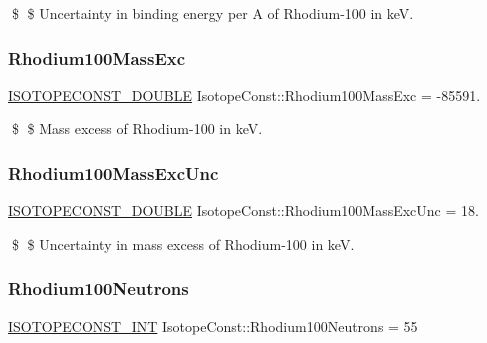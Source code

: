 \$ \$ Uncertainty in binding energy per A of Rhodium-\/100 in keV. \mbox{\label{group___isotope_const-_rhodium-_rh100_ga8375b85370324d155621dcaed4cbadf2}} 
\subsubsection{\texorpdfstring{Rhodium100\+Mass\+Exc}{Rhodium100MassExc}}
{\footnotesize\ttfamily \mbox{\hyperlink{group___isotope_const-_macros_ga8f45a7272ce02c0b4c65c44636ed719a}{I\+S\+O\+T\+O\+P\+E\+C\+O\+N\+S\+T\+\_\+\+D\+O\+U\+B\+LE}} Isotope\+Const\+::\+Rhodium100\+Mass\+Exc = -\/85591.}

\$ \$ Mass excess of Rhodium-\/100 in keV. \mbox{\label{group___isotope_const-_rhodium-_rh100_ga04c970123fe638c3a24f77a9545494cb}} 
\subsubsection{\texorpdfstring{Rhodium100\+Mass\+Exc\+Unc}{Rhodium100MassExcUnc}}
{\footnotesize\ttfamily \mbox{\hyperlink{group___isotope_const-_macros_ga8f45a7272ce02c0b4c65c44636ed719a}{I\+S\+O\+T\+O\+P\+E\+C\+O\+N\+S\+T\+\_\+\+D\+O\+U\+B\+LE}} Isotope\+Const\+::\+Rhodium100\+Mass\+Exc\+Unc = 18.}

\$ \$ Uncertainty in mass excess of Rhodium-\/100 in keV. \mbox{\label{group___isotope_const-_rhodium-_rh100_ga7943ad6589b4fe859db04a8a1a07a814}} 
\subsubsection{\texorpdfstring{Rhodium100\+Neutrons}{Rhodium100Neutrons}}
{\footnotesize\ttfamily \mbox{\hyperlink{group___isotope_const-_macros_ga5f18360b3e99483a35c32d789e62621c}{I\+S\+O\+T\+O\+P\+E\+C\+O\+N\+S\+T\+\_\+\+I\+NT}} Isotope\+Const\+::\+Rhodium100\+Neutrons = 55}

